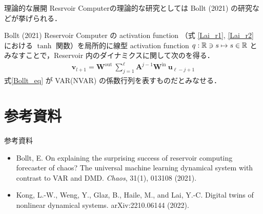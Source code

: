 \begin{frame}{理論的な展開}
    Resrvoir Computerの理論的な研究としては Bollt (2021) の研究などが挙げられる．
    \begin{block}{Bollt (2021)}
        Reservoir Computer の activation function （式 \eqref{Lai_r1}, \eqref{Lai_r2} における $\tanh$ 関数）を局所的に線型 activation function $q:\mathbb{R} \ni s \mapsto s \in \mathbb{R}$ とみなすことで，Reservoir 内のダイナミクスに関して次のを得る． \vspace{-.5cm}
        \begin{align}
            \mathbf{v}_{l+1} = \mathbf{W}^{\text {out }} \sum_{j=1}^{\ell} \mathbf{A}^{j-1} \mathbf{W}^{\text {in }} \mathbf{u}_{\ell-j+1} \label{Bollt_eq}
        \end{align}
        式\eqref{Bollt_eq} が VAR(NVAR) の係数行列を表すものだとみなせる．
    \end{block}

\end{frame}


\section{参考資料}
\begin{frame}{参考資料}
    \begin{minipage}{0.49\textwidth}
        \begin{itemize}
            \item Bollt, E. On explaining the surprising success of reservoir computing forecaster of chaos? The universal machine learning dynamical system with contrast to VAR and DMD. \textit{Chaos}, 31(1), 013108 (2021). 
        \end{itemize}    
    \end{minipage}
    \begin{minipage}{0.5\textwidth}
        \begin{itemize}
            \item Kong, L.-W., Weng, Y., Glaz, B., Haile, M., and Lai, Y.-C. Digital twins of nonlinear dynamical systems. arXiv:2210.06144 (2022).
        \end{itemize}
    \end{minipage}
\end{frame}

